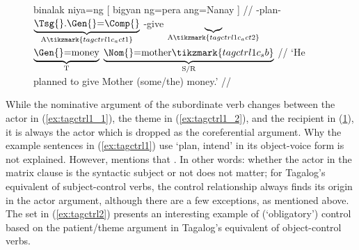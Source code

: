 \begin{figure}
\a\label{ex:tagctrl1_3}\begingl[aboveglbskip=1.5em, aboveglftskip=1.75em]
	\gla binalak niya=ng \textup{[} bigyan {} ng=pera ang=Nanay \textup{]} //
	\glb \Pfv{}-plan-\Ov{}
		$\underbrace{\text{\smash{\Tsg{}}.\Gen{}=\Comp{}}}_{\text{A}%
			\tikzmark{tagctrl1c_act1}%
		}$
		{}
		\Dv{}-give%
		$\underbrace{}_{\text{A}%
			\tikzmark{tagctrl1c_act2}%
		}$
		$\underbrace{\text{\Gen{}=\smash{money}}}_{\text{T}}$
		$\underbrace{\text{\Nom{}=mother}%
			\tikzmark{tagctrl1c_sb}%
		}_{\text{S/R}}$
		{} //
	\glft `He planned to give Mother (some/the) money.' //
\endgl
{}

\xe
\end{figure}

While the nominative argument of the subordinate verb changes between the actor
in (\ref{ex:tagctrl1_1}), the theme in (\ref{ex:tagctrl1_2}), and the recipient
in (\ref{ex:tagctrl1_3}), it is always the actor which is dropped as the
coreferential argument. Why the example sentences in (\ref{ex:tagctrl1}) use
 `plan, intend' in its object-voice form is not explained. However,
\citet{kroeger1991} mentions that . In other words: whether the actor in the
matrix clause is the syntactic subject or not does not matter; for Tagalog's
equivalent of subject-control verbs, the control relationship always finds its
origin in the actor argument, although there are a few exceptions, as mentioned
above. The set in (\ref{ex:tagctrl2}) presents an interesting example of
(`obligatory') control based on the patient/theme argument in Tagalog's
equivalent of object-control verbs.

